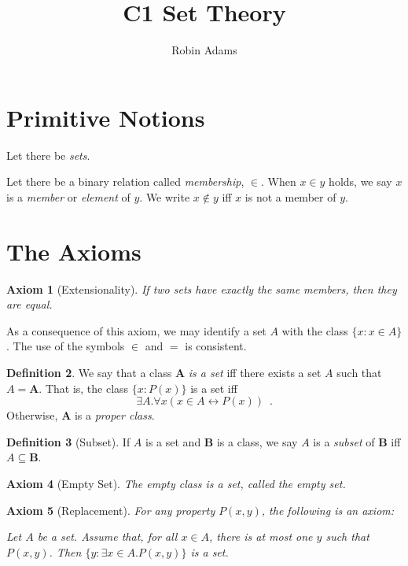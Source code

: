 \documentclass{article}
\title{C1 Set Theory}
\author{Robin Adams}
\newtheorem{axiom}{Axiom}
\theoremstyle{definition}
\newtheorem{definition}[axiom]{Definition}
\begin{document}
    \maketitle

    \section{Primitive Notions}

    Let there be \emph{sets}.

    Let there be a binary relation called \emph{membership}, $\in$. When $x \in y$ holds, we say $x$ is a
    \emph{member} or \emph{element} of $y$. We write $x \notin y$ iff $x$ is not a member of $y$.

    \section{The Axioms}

    \begin{axiom}[Extensionality]
        If two sets have exactly the same members, then they are equal.
    \end{axiom}

    As a consequence of this axiom, we may identify a set $A$ with the class $\{ x : x \in A \}$. The use of
    the symbols $\in$ and $=$ is consistent.

    \begin{definition}
    We say that a class $\mathbf{A}$ \emph{is a set} iff there exists a set $A$ such that $A = \mathbf{A}$.
    That is, the class $\{ x : P(x) \}$ is a set iff
    \[ \exists A. \forall x (x \in A \leftrightarrow P(x)) \enspace . \]
    Otherwise, $\mathbf{A}$ is a \emph{proper class}.
    \end{definition}

    \begin{definition}[Subset]
        If $A$ is a set and $\mathbf{B}$ is a class, we say $A$ is a \emph{subset} of $\mathbf{B}$
        iff $A \subseteq \mathbf{B}$.
    \end{definition}

    \begin{axiom}[Empty Set]
        The empty class is a set, called the \emph{empty set}.
    \end{axiom}

    \begin{axiom}[Replacement]
        For any property $P(x,y)$, the following is an axiom:

        Let $A$ be a set. Assume that, for all $x \in A$, there is at most one $y$ such that $P(x,y)$.
        Then $\{ y : \exists x \in A. P(x,y) \}$ is a set.
    \end{axiom}
\end{document}
